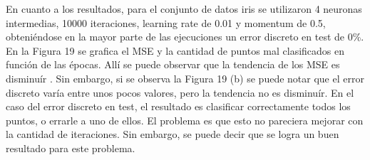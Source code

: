 \documentclass[12pt, a4paper]{article}
\begin{document}
\bigskip
En cuanto a los resultados, para el conjunto de datos iris se utilizaron 4 neuronas intermedias, 10000 iteraciones, learning rate de 0.01 y momentum de 0.5, obteniéndose en la mayor parte de las ejecuciones un error discreto en test de 0\%. En la Figura 19 se grafica el MSE y la cantidad de puntos mal clasificados en función de las épocas. Allí se puede observar que la tendencia de los MSE es disminuír . Sin embargo, si se observa la Figura 19 (b) se puede notar que el error discreto varía entre unos pocos valores, pero la tendencia no es disminuír. En el caso del error discreto en test, el resultado es clasificar correctamente todos los puntos, o errarle a uno de ellos. El problema es que esto no pareciera mejorar con la cantidad de iteraciones. Sin embargo, se puede decir que se logra un buen resultado para este problema.
\end{document}
